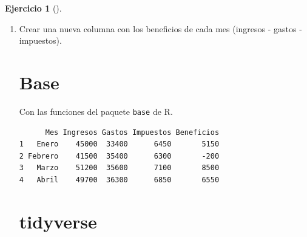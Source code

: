 \documentclass[
  spanish,
  a4paper,
]{scrreport}
\newenvironment{Shaded}{\begin{snugshade}}{\end{snugshade}}
\newcommand{\NormalTok}[1]{\textcolor[rgb]{0.00,0.23,0.31}{#1}}
\newcommand{\OtherTok}[1]{\textcolor[rgb]{0.00,0.23,0.31}{#1}}
\newcommand{\SpecialCharTok}[1]{\textcolor[rgb]{0.37,0.37,0.37}{#1}}
\theoremstyle{definition}
\newtheorem{exercise}{Ejercicio}[chapter]
\theoremstyle{remark}
\begin{document}
\begin{exercise}[]
\begin{enumerate}
\begin{tcolorbox}
\begin{verbatim}
      Mes Ingresos Gastos Impuestos
1   Enero    45000  33400      6450
2 Febrero    41500  35400      6300
3   Marzo    51200  35600      7100
4   Abril    49700  36300      6850
\end{verbatim}

  \end{tcolorbox}
\item
  Crear una nueva columna con los beneficios de cada mes (ingresos -
  gastos - impuestos).

  \begin{tcolorbox}[enhanced jigsaw, titlerule=0mm, arc=.35mm, rightrule=.15mm, opacitybacktitle=0.6, leftrule=.75mm, colframe=quarto-callout-tip-color-frame, toptitle=1mm, breakable, colbacktitle=quarto-callout-tip-color!10!white, bottomrule=.15mm, colback=white, left=2mm, bottomtitle=1mm, opacityback=0, title=\textcolor{quarto-callout-tip-color}{\faLightbulb}\hspace{0.5em}{Solución}, toprule=.15mm, coltitle=black]

  \section{Base}

  Con las funciones del paquete \texttt{base} de R.

\begin{Shaded}
\end{Shaded}

\begin{verbatim}
      Mes Ingresos Gastos Impuestos Beneficios
1   Enero    45000  33400      6450       5150
2 Febrero    41500  35400      6300       -200
3   Marzo    51200  35600      7100       8500
4   Abril    49700  36300      6850       6550
\end{verbatim}

  \section{tidyverse}


\end{tcolorbox}
\end{enumerate}
\end{exercise}
\end{document}
